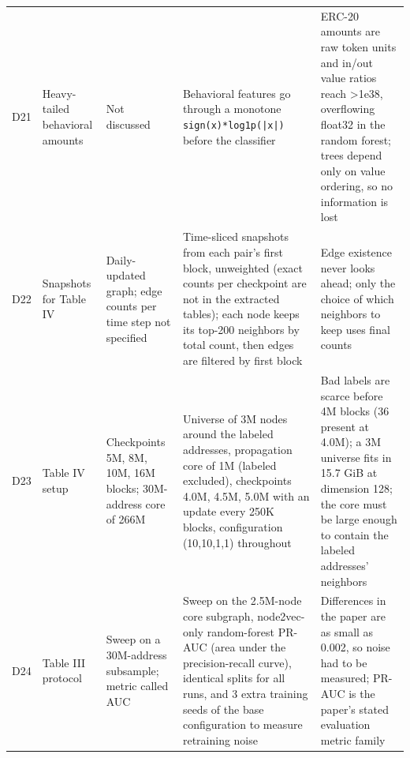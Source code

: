 \begin{longtable}{p{0.7cm} p{2.1cm} p{3.2cm} p{4.2cm} p{3.6cm}}
D21 & Heavy-tailed behavioral amounts & Not discussed & Behavioral features go through a monotone \texttt{sign(x)*log1p(|x|)} before the classifier & ERC-20 amounts are raw token units and in/out value ratios reach >1e38, overflowing float32 in the random forest; trees depend only on value ordering, so no information is lost\\[2pt]
D22 & Snapshots for Table IV & Daily-updated graph; edge counts per time step not specified & Time-sliced snapshots from each pair's first block, unweighted (exact counts per checkpoint are not in the extracted tables); each node keeps its top-200 neighbors by total count, then edges are filtered by first block & Edge existence never looks ahead; only the choice of which neighbors to keep uses final counts\\[2pt]
D23 & Table IV setup & Checkpoints 5M, 8M, 10M, 16M blocks; 30M-address core of 266M & Universe of 3M nodes around the labeled addresses, propagation core of 1M (labeled excluded), checkpoints 4.0M, 4.5M, 5.0M with an update every 250K blocks, configuration (10,10,1,1) throughout & Bad labels are scarce before 4M blocks (36 present at 4.0M); a 3M universe fits in 15.7 GiB at dimension 128; the core must be large enough to contain the labeled addresses' neighbors\\[2pt]
D24 & Table III protocol & Sweep on a 30M-address subsample; metric called AUC & Sweep on the 2.5M-node core subgraph, node2vec-only random-forest PR-AUC (area under the precision-recall curve), identical splits for all runs, and 3 extra training seeds of the base configuration to measure retraining noise & Differences in the paper are as small as 0.002, so noise had to be measured; PR-AUC is the paper's stated evaluation metric family\\[2pt]
\bottomrule
\end{longtable}